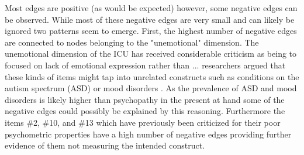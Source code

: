 Most edges are positive (as would be expected) however, some negative edges can be observed.
While most of these negative edges are very small and can likely be ignored two patterns seem to emerge.
First, the highest number of negative edges are connected to nodes belonging to the "unemotional" dimension.
The unemotional dimension of the ICU has received considerable criticism as being to focused on lack of emotional expression rather than ... 
researchers argued that these kinds of items might tap into unrelated constructs such as conditions on the autism spectrum (ASD) or mood disorders .
As the prevalence of ASD and mood disorders is likely higher than psychopathy in the present at hand some of the negative edges could possibly be explained by this reasoning.
Furthermore the items \#2, \#10, and \#13 which have previously been criticized for their poor psychometric properties have a high number of negative edges providing further evidence of them not measuring the intended construct. 


